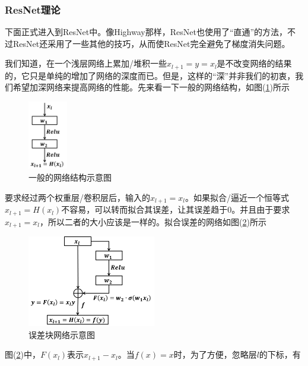         \subsubsection{ResNet理论}
            \par
            下面正式进入到ResNet中。像Highway那样，ResNet也使用了“直通”的方法，不过ResNet还采用了一些其他的技巧，从而使ResNet完全避免了梯度消失问题。
            \par
            我们知道，在一个浅层网络上累加/堆积一些$x_{l+1} = y = x_l$是不改变网络的结果的，它只是单纯的增加了网络的深度而已。但是，这样的“深”并非我们的初衷，我们希望加深网络来提高网络的性能。先来看一下一般的网络结构，如图(\ref{fig:一般的网络结构示意图})所示
             \begin{figure}[H]
            \centering
            \includegraphics[height=3cm]{images/normal_Network.jpg}
            \caption{一般的网络结构示意图}
            \label{fig:一般的网络结构示意图}
            \end{figure}
            要求经过两个权重层/卷积层后，输入的$x_{l+1} = x_l$。如果拟合/逼近一个恒等式$x_{l+1} = H(x_l)$不容易，可以转而拟合其误差，让其误差趋于0。并且由于要求$x_{l+1} = x_l$，所以二者的大小应该是一样的。拟合误差的网络如图(\ref{fig:误差块网络示意图})所示
             \begin{figure}[H]
            \centering
            \includegraphics[height=4cm]{images/Error_block_network_diagram.jpg}
            \caption{误差块网络示意图}
            \label{fig:误差块网络示意图}
            \end{figure}
            图(\ref{fig:误差块网络示意图})中，$F(x_l)$表示$x_{l+1}-x_l$。当$f(x) = x$时，为了方便，忽略层$l$的下标，有
